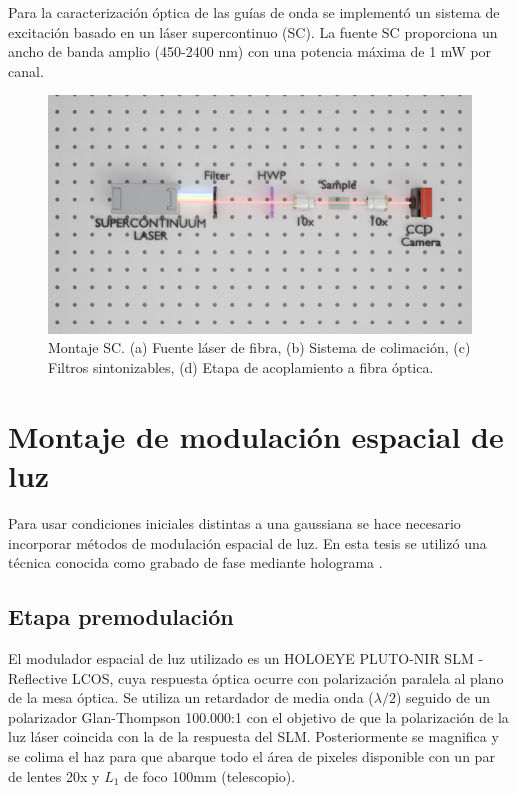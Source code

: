 Para la caracterización óptica de las guías de onda se implementó un sistema de excitación basado en un láser supercontinuo (SC). La fuente SC proporciona un ancho de banda amplio (450-2400 nm) con una potencia máxima de 1 mW por canal.

\begin{figure}[H]
    \centering
    \includegraphics[width=\linewidth, trim={5cm 9cm 3cm 7cm},clip]{media/SC_setup}
    \caption{Montaje SC. (a) Fuente láser de fibra, (b) Sistema de colimación, (c) Filtros sintonizables, (d) Etapa de acoplamiento a fibra óptica.}
\end{figure}

\section{Montaje de modulación espacial de luz}

Para usar condiciones iniciales distintas a una gaussiana se hace necesario incorporar métodos de modulación espacial de luz. En esta tesis se utilizó una técnica conocida como grabado de fase mediante holograma \citep{terhalle}.

\subsection{Etapa premodulación}
El modulador espacial de luz utilizado es un HOLOEYE PLUTO-NIR SLM - Reflective LCOS, cuya respuesta óptica ocurre con polarización paralela al plano de la mesa óptica. Se utiliza un retardador de media onda ($\lambda/2$) seguido de un polarizador Glan-Thompson 100.000:1 con el objetivo de que la polarización de la luz láser coincida con la de la respuesta del SLM. Posteriormente se magnifica y se colima el haz para que abarque todo el área de pixeles disponible con un par de lentes 20x y $L_1$ de foco 100mm (telescopio).

